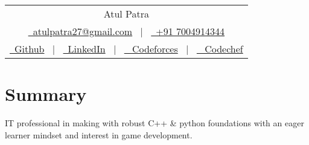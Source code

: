 \documentclass[a4paper,10pt]{article}
\begin{document}
\pagestyle{empty} 
\begin{tabularx}{\linewidth}{@{} C @{}}
\Huge{Atul Patra} \\[7.5pt]
\href{mailto:atulpatra27@gmail.com}{\raisebox{-0.05\height} \ atulpatra27@gmail.com} \ $|$ \ 
\href{tel:+91 7004914344}{\raisebox{-0.05\height}\ +91 7004914344} \\
\href{https://github.com/flxcsx}{\raisebox{-0.05\height}\ Github} \ $|$ \ 
\href{https://www.linkedin.com/in/altxt/}{\raisebox{-0.05\height}\ LinkedIn} \ $|$ \ 
\href{https://codeforces.com/profile/altxt}{\raisebox{-0.05\height} \ Codeforces} \ $|$ \ 
\href{https://codechef.com/users/altxt}{\raisebox{-0.05\height} \ Codechef} 
\end{tabularx}
\section{Summary}
IT professional in making with robust C++ \& python foundations with an eager learner mindset and interest in game development.
\end{document}

